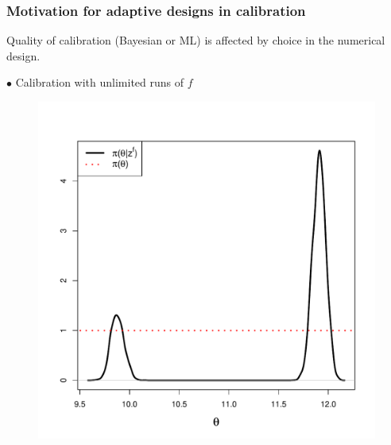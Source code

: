 \documentclass[nopagenumber,9pt]{beamer}
\begin{document}
  \begin{frame}
 \frametitle{Motivation for adaptive designs in calibration}
   Quality of calibration (Bayesian or ML) is affected by choice in the numerical design.
 \\
 \bigskip
  
  
$\bullet$ Calibration with unlimited runs of $f$
  \begin{center}
   \begin{figure}
    \includegraphics[scale=0.3]{calib_sans_biais_jouet_true.pdf}
   \end{figure}

  \end{center}

 \end{frame}
\end{document}
